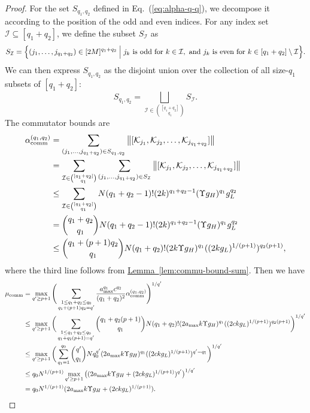 \documentclass[11pt]{article}
\newcommand{\eq}[1]{(\ref{eq:#1})}
\newcommand{\lem}[1]{\hyperref[lem:#1]{Lemma~\ref*{lem:#1}}}
\newcommand{\mc}{\mathcal}
\begin{document}
\begin{proof}
    For the set $S_{q_1, q_2}$ defined in Eq.~\eq{alpha-q-q}, we decompose it according to the position of the odd and even indices.  For any index set $\mathcal{I} \subseteq [q_1+q_2]$, we define the subset $S_{\mathcal{I}}$ as
    \[
    S_{\mathcal{I}} = \Bigl\{ (j_1, \ldots, j_{q_1+q_2}) \in [2M]^{q_1+q_2} \Bigm| 
        j_k \text{ is odd for } k \in \mathcal{I}, \text{ and } 
        j_k \text{ is even for } k \in [q_1+q_2] \setminus \mathcal{I}
    \Bigr\}.
    \]
    We can then express $S_{q_1, q_2}$ as the disjoint union over the collection of all size-$q_1$ subsets of $[q_1+q_2]$:
    \[
    S_{q_1, q_2} = \bigsqcup_{\mathcal{I} \in \binom{[q_1+q_2]}{q_1}} S_{\mathcal{I}}.
    \]
    The commutator bounds are \begin{align*}
    \alpha_{\rm comm}^{(q_1,q_2)} &=  \sum_{(j_1, \ldots, j_{q_1+q_2})\in S_{q_1, q_2}}\big\|[\mc K_{j_1}, \mc K_{j_2},\ldots,\mc K_{j_{q_1+q_2}}]\big\|\\
    &= \sum_{\mc I\in \binom{[q_1+q_2]}{q_1}}\sum_{(j_1, \ldots, j_{q_1+q_2})\in S_{\mc I}}\big\|[\mc K_{j_1}, \mc K_{j_2},\ldots,\mc K_{j_{q_1+q_2}}]\big\|\\
    &\le \sum_{\mc I\in \binom{[q_1+q_2]}{q_1}} N(q_1+q_2-1)!(2k)^{q_1+q_2-1}(\Upsilon g_H)^{q_1}g_L^{q_2}\\
    &= \binom{q_1+q_2}{q_1}N(q_1+q_2-1)!(2k)^{q_1+q_2-1}(\Upsilon g_H)^{q_1}g_L^{q_2}\\
    &\le \binom{q_1+(p+1)q_2}{q_1}N(q_1+q_2)!(2k\Upsilon g_H)^{q_1}((2kg_L)^{1/(p+1)})^{q_2(p+1)},
    \end{align*}
    where the third line follows from \lem{commu-bound-sum}. Then we have  \begin{align*}
        \mu_{\rm comm} &= \max_{q' \ge p+1} \Bigg(\sum_{\substack{1\le q_1+q_2\le q_0 \\
        q_1+(p+1)q_2 = q'}}\frac{a_{\max}^{q_1}c^{q_2}}{(q_1+q_2)^2} \alpha_{\rm comm}^{(q_1, q_2)}\Bigg)^{1/q'} \\
        &\le \max_{q' \ge p+1} \bigg(\sum_{\substack{1\le q_1+q_2\le q_0 \\
        q_1+q_2(p+1) = q'}}\binom{q_1+q_2(p+1)}{q_1}N(q_1+q_2)!(2a_{\max}k\Upsilon g_H)^{q_1}((2ckg_L)^{1/(p+1)})^{q_2(p+1)}\bigg)^{1/q'}\\
        &\le \max_{q' \ge p+1} \bigg(\sum_{q_1=1}^{q_0}\binom{q'}{q_1}Nq_0^{q'}(2a_{\max}k\Upsilon g_H)^{q_1}((2ckg_L)^{1/(p+1)})^{q'-q_1}\bigg)^{1/q'}\\
        &\le q_0N^{1/(p+1)}\max_{q'\ge p+1} \big((2a_{\max}k\Upsilon g_H+(2ckg_L)^{1/(p+1)})^{q'}\big)^{1/q'}\\
        &=q_0N^{1/(p+1)}(2a_{\max}k\Upsilon g_H+(2ckg_L)^{1/(p+1)}).
    \end{align*}
\end{proof}
\end{document}
